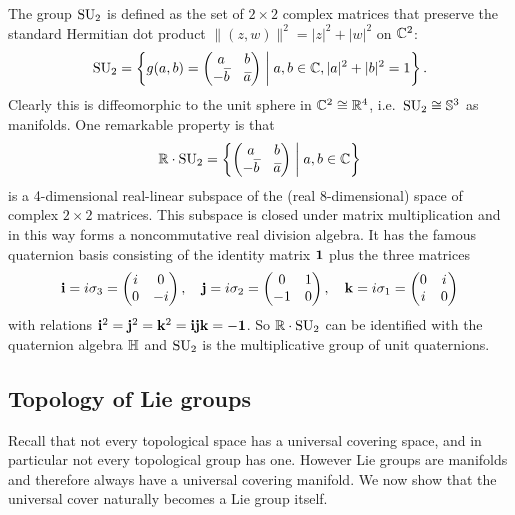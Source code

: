 \begin{example}
    The group $\SU_2$ is defined as the set of $2\times2$ complex matrices that preserve the standard Hermitian dot product $\lVert(z,w)\rVert^2=|z|^2+|w|^2$ on $\bbC^2$:
    \[\SU_2=\left\{g(a,b)=
    \begin{pmatrix}
        a&b\\-\wb{b}&\wb{a}
    \end{pmatrix}
    \middle| a,b\in\bbC, |a|^2+|b|^2=1
    \right\}.\]
    Clearly this is diffeomorphic to the unit sphere in $\bbC^2\cong \bbR^4$, i.e.~$\SU_2\cong \bbS^3$ as manifolds. One remarkable property is that 
    \[\bbR\cdot \SU_2=\left\{
    \begin{pmatrix}
        a&b\\-\wb{b}&\wb{a}
    \end{pmatrix}
    \middle| a,b\in\bbC
    \right\}\]
    is a 4-dimensional real-linear subspace of the (real 8-dimensional) space of complex $2\times 2$ matrices. This subspace is closed under matrix multiplication and in this way forms a noncommutative real division algebra. It has the famous quaternion basis consisting of the identity matrix $\bf{1}$ plus the three matrices
    \[\bf{i}=i\sigma_3=\begin{pmatrix}
        i&0\\0&-i
    \end{pmatrix},\quad 
    \bf{j}=i\sigma_2=\begin{pmatrix}
        0&1\\-1&0
    \end{pmatrix},\quad
    \bf{k}=i\sigma_1=\begin{pmatrix}
        0&i\\i&0
    \end{pmatrix}\]
    with relations $\bf{i}^2=\bf{j}^2=\bf{k}^2=\bf{ijk}=-\bf{1}$. So $\bbR\cdot\SU_2$ can be identified with the quaternion algebra $\bbH$ and $\SU_2$ is the multiplicative group of unit quaternions.
\end{example}










\subsection{Topology of Lie groups}

Recall that not every topological space has a universal covering space, and in particular not every topological group has one. However Lie groups are manifolds and therefore always have a universal covering manifold. We now show that the universal cover naturally becomes a Lie group itself.

